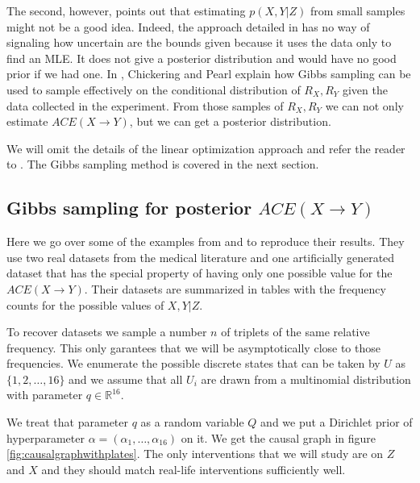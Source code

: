 \documentclass[a4paper, 10pt]{article}
\begin{document}
The second, however, points out that estimating $p(X,Y|Z)$ from small samples
might not be a good idea. Indeed, the approach detailed in \cite{pearl2000cmr}
has no way of signaling how uncertain are the bounds given because it uses
the data only to find an MLE. It does not give a posterior distribution and
would have no good prior if we had one. In \cite{chickering1997cst},
Chickering and Pearl explain how
Gibbs sampling can be used to sample effectively on the conditional distribution
of $R_X,R_Y$ given the data collected in the experiment. From those samples of
$R_X,R_Y$ we can not only estimate $ACE(X\rightarrow Y)$, but we can get a
posterior distribution.

We will omit the details of the linear optimization approach and refer the
reader to \cite{pearl2000cmr}. The Gibbs sampling method is covered in the
next section.


\subsection{Gibbs sampling for posterior $ACE(X\rightarrow Y)$}

Here we go over some of the examples from \cite{pearl2000cmr} and
\cite{chickering1997cst} to reproduce their
results. They use two real datasets from the medical literature and one
artificially generated dataset that has the special property of having only one
possible value for the
$ACE(X\rightarrow Y)$. Their datasets are summarized in tables with the
frequency counts for the possible values of $X,Y|Z$.

To recover datasets we sample a number $n$ of triplets of the
same relative frequency. This only garantees that we will be asymptotically
close to those frequencies. We enumerate the possible discrete states that can
be taken by $U$ as $\{1,2,\ldots, 16\}$ and we assume that all $U_i$ are drawn
from a multinomial distribution with parameter $q\in
\mathbb{R}^{16}$.

We treat that parameter $q$ as a random variable $Q$ and we put a Dirichlet
prior of hyperparameter $\alpha=(\alpha_1,\ldots, \alpha_{16})$ on it.
We get the causal graph in figure \ref{fig:causalgraphwithplates}. The only
interventions that we will study are on $Z$ and $X$ and they should match
real-life interventions sufficiently well.
\end{document}
